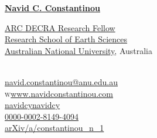 \documentclass[10pt, letter]{article}
\def\www{http://www.navidconstantinou.com}
\newcommand{\rses}{
\href{https://earthsciences.anu.edu.au}{\color{black}Research School of Earth Sciences}}
\newcommand{\anu}{
\href{http://www.anu.edu.au}{\color{black}Australian National University}}
\begin{document}
\reversemarginpar
{\huge{ \href{http://www.navidconstantinou.com}{\color{jhublue}\bf Navid C. Constantinou}}}\\[.42cm]
\parbox{.57\linewidth}{
{\href{https://rms.arc.gov.au/RMS/Report/Download/Report/1b0c8b2e-7bb0-4f2d-8f52-ad207cfbb41d/219}{\color{black}ARC DECRA Research Fellow}}\\
\rses\\
\anu, Australia\\
\mbox{}\\
}
\parbox{.43\linewidth}{
{}\hspace{.26cm}\href{mailto:navid.constantinou@anu.edu.au}{navid.constantinou@anu.edu.au}\\
\textsc{w}\hspace{.24cm}\href{\www}{www.navidconstantinou.com}\\
\faGithub\hspace{.24cm}\href{https://github.com/navidcy}{navidcy}\hspace{3.9em}\faVimeo\hspace{.24cm}\href{https://vimeo.com/navidcy}{navidcy}\\
{}\hspace{.24cm}\href{http://orcid.org/0000-0002-8149-4094}{0000-0002-8149-4094}\\
{}\hspace{.24cm}\href{https://arxiv.org/a/constantinou_n_1.html}{arXiv/a/constantinou\_n\_1}}






%
%
%
\end{document}
